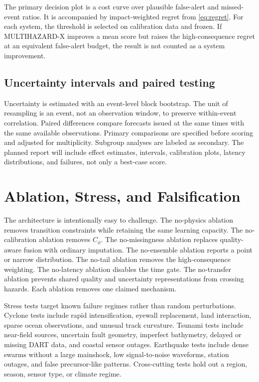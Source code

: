 \documentclass[conference]{IEEEtran}
\begin{document}
The primary decision plot is a cost curve over plausible false-alert and missed-event ratios. It is accompanied by impact-weighted regret from \eqref{eq:regret}. For each system, the threshold is selected on calibration data and frozen. If MULTIHAZARD-X improves a mean score but raises the high-consequence regret at an equivalent false-alert budget, the result is not counted as a system improvement.

\subsection{Uncertainty intervals and paired testing}

Uncertainty is estimated with an event-level block bootstrap. The unit of resampling is an event, not an observation window, to preserve within-event correlation. Paired differences compare forecasts issued at the same times with the same available observations. Primary comparisons are specified before scoring and adjusted for multiplicity. Subgroup analyses are labeled as secondary. The planned report will include effect estimates, intervals, calibration plots, latency distributions, and failures, not only a best-case score.

\section{Ablation, Stress, and Falsification}

The architecture is intentionally easy to challenge. The no-physics ablation removes transition constraints while retaining the same learning capacity. The no-calibration ablation removes $C_\phi$. The no-missingness ablation replaces quality-aware fusion with ordinary imputation. The no-ensemble ablation reports a point or narrow distribution. The no-tail ablation removes the high-consequence weighting. The no-latency ablation disables the time gate. The no-transfer ablation prevents shared quality and uncertainty representations from crossing hazards. Each ablation removes one claimed mechanism.

Stress tests target known failure regimes rather than random perturbations. Cyclone tests include rapid intensification, eyewall replacement, land interaction, sparse ocean observations, and unusual track curvature. Tsunami tests include near-field sources, uncertain fault geometry, imperfect bathymetry, delayed or missing DART data, and coastal sensor outages. Earthquake tests include dense swarms without a large mainshock, low signal-to-noise waveforms, station outages, and false precursor-like patterns. Cross-cutting tests hold out a region, season, sensor type, or climate regime.
\end{document}
